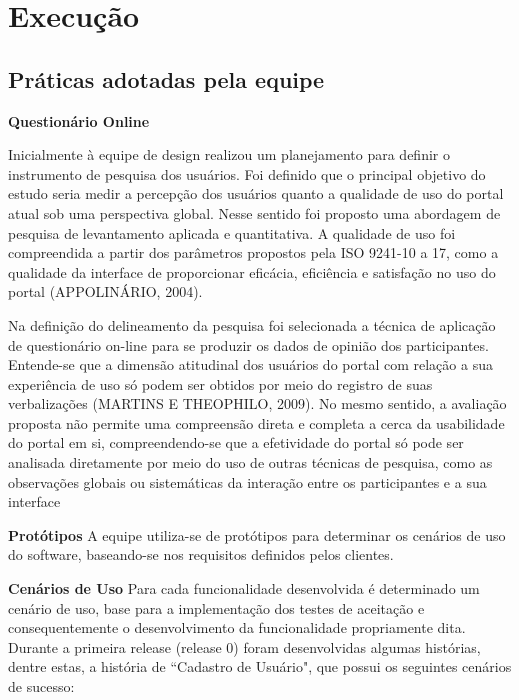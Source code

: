  
 
\section{Execução}

\subsection{Práticas adotadas pela equipe}

\textbf{Questionário Online}

Inicialmente à equipe de design realizou um planejamento para definir o instrumento de pesquisa dos usuários. Foi definido que o principal objetivo do estudo seria medir a percepção dos usuários quanto a qualidade de uso do portal atual sob uma perspectiva global. Nesse sentido foi proposto uma abordagem de pesquisa de levantamento aplicada e quantitativa. A qualidade de uso foi compreendida a partir dos parâmetros propostos pela ISO 9241-10 a 17, como a qualidade da interface de proporcionar eficácia, eficiência e satisfação no uso do portal (APPOLINÁRIO, 2004). 

Na definição do delineamento da pesquisa foi selecionada a técnica de aplicação de questionário on-line para se produzir os dados de opinião dos participantes. Entende-se que a dimensão atitudinal dos usuários do portal com relação a sua experiência de uso só podem ser obtidos por meio do registro de suas verbalizações (MARTINS E THEOPHILO, 2009). No mesmo sentido, a avaliação proposta não permite uma compreensão direta e completa a cerca da usabilidade do portal em si, compreendendo-se que a efetividade do portal só pode ser analisada 
diretamente por meio do uso de outras técnicas de pesquisa, como as observações globais ou sistemáticas da interação entre os participantes e a sua interface %

\textbf{Protótipos}
	A equipe utiliza-se de protótipos para determinar os cenários de uso do software, baseando-se nos requisitos definidos pelos clientes. 

\textbf{Cenários de Uso}
	Para cada funcionalidade desenvolvida é determinado um cenário de uso, base para a implementação dos testes de aceitação e consequentemente o desenvolvimento da funcionalidade propriamente dita.
	Durante a primeira release (release 0) foram desenvolvidas algumas histórias, dentre estas, a história de ``Cadastro de Usuário", que possui os seguintes cenários de sucesso:


